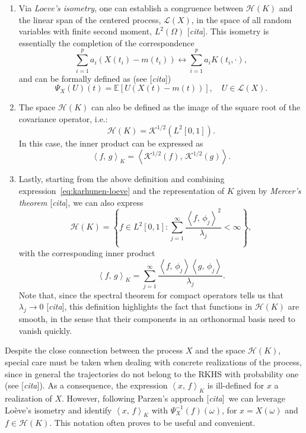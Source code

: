 \documentclass[ba]{imsart}
\numberwithin{equation}{section}
\theoremstyle{plain}
\newcommand{\E}{\mathbb{E}}
\newcommand\dotprod[2]{\left\langle #1,\, #2 \right\rangle}
\newcommand\incomment[1]{\color{red}[\textit{#1}]\color{black}}
\begin{document}
\begin{enumerate}
  \item Via \textit{Loeve's isometry}, one can establish a congruence between \(\mathcal H(K)\) and the linear span of the centered process, \(\mathcal L(X)\), in the space of all random variables with finite second moment, \(L^2(\Omega)\) \incomment{cita}. This isometry is essentially the completion of the correspondence
  \[
  \sum_{i=1}^p a_i (X(t_i) - m(t_i)) \longleftrightarrow \sum_{i=1}^p a_i K(t_i, \cdot),
\]
and can be formally defined as (see \incomment{cita})
\begin{equation}\label{eq:loeves-isometry}
  \Psi_X(U)(t) = \E[U(X(t) - m(t))], \quad U \in \mathcal L(X).
\end{equation}
  \item The space \(\mathcal H(K)\) can also be defined as the image of the square root of the covariance operator, i.e.:
  \begin{equation}\label{eq:rkhs-square-root}
  \mathcal H(K) = \mathcal K^{1/2}(L^2[0, 1]).
\end{equation}
In this case, the inner product can be expressed as
\[
\dotprod{f}{g}_K = \dotprod{\mathcal K^{1/2}(f)}{\mathcal K^{1/2}(g)}.
\]

  \item Lastly, starting from the above definition and combining expression~\eqref{eq:karhunen-loeve} and the representation of \(K\) given by \textit{Mercer's theorem} \incomment{cita}, we can also express
  \begin{equation}\label{rkhs-sum-lambda}
    \mathcal H(K) = \left\{f \in L^2[0, 1]: \sum_{j=1}^\infty \frac{\dotprod{f}{\phi_j}^2}{\lambda_j} < \infty \right\},
  \end{equation}
  with the corresponding inner product
  \[
  \dotprod{f}{g}_K = \sum_{j=1}^\infty \frac{\dotprod{f}
  {\phi_j}\dotprod{g}{\phi_j}}{\lambda_j}.
  \]
Note that, since the spectral theorem for compact operators tells us that \(\lambda_j \to 0\) \incomment{cita}, this definition highlights the fact that functions in \(\mathcal H(K)\) are smooth, in the sense that their components in an orthonormal basis need to vanish quickly.
\end{enumerate}

Despite the close connection between the process \(X\) and the space \(\mathcal H(K)\), special care must be taken when dealing with concrete realizations of the process, since in general the trajectories do not belong to the RKHS with probability one (see \incomment{cita}). As a consequence, the expression \(\dotprod{x}{f}_K\) is ill-defined for \(x\) a realization of \(X\). However, following Parzen's approach \incomment{cita}\ we can leverage Loève's isometry and identify \(\dotprod{x}{f}_K \) with \( \Psi_X^{-1}(f)(\omega)\), for \(x=X(\omega)\) and \(f\in \mathcal H(K)\). This notation often proves to be useful and convenient.
\end{document}
